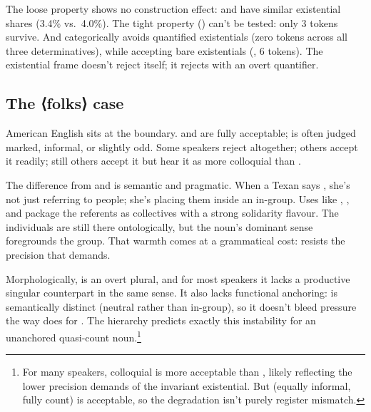 \documentclass[12pt,a4paper]{article}
\DeclareRobustCommand{\mentionhead}[1]{⟨\textup{#1}⟩} %
\begin{document}


The loose property shows no construction effect:  and  have similar existential shares (3.4\% vs.\ 4.0\%). The tight property () can't be tested: only 3 tokens survive. And  categorically avoids quantified existentials (zero tokens across all three determinatives), while accepting bare existentials (, 6 tokens). The existential frame doesn't reject  itself; it rejects  with an overt quantifier.

\subsection{The \mentionhead{folks} case}\label{sec:folks}

American English  sits at the boundary.  and  are fully acceptable;  is often judged marked, informal, or slightly odd. Some speakers reject  altogether; others accept it readily; still others accept it but hear it as more colloquial than .

The difference from  and  is semantic and pragmatic. When a Texan says , she's not just referring to people; she's placing them inside an in-group. Uses like , , and  package the referents as collectives with a strong solidarity flavour. The individuals are still there ontologically, but the noun's dominant sense foregrounds the group. That warmth comes at a grammatical cost:  resists the precision that  demands.

Morphologically,  is an overt plural, and for most speakers it lacks a productive singular counterpart in the same sense. It also lacks functional anchoring:  is semantically distinct (neutral rather than in-group), so it doesn't bleed pressure the way  does for . The hierarchy predicts exactly this instability for an unanchored quasi-count noun.\footnote{For many speakers, colloquial  is more acceptable than , likely reflecting the lower precision demands of the invariant existential. But  (equally informal, fully count) is acceptable, so the  degradation isn't purely register mismatch.}
\end{document}
